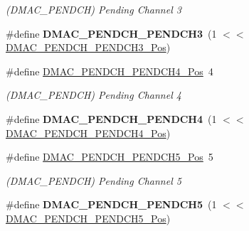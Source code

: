 \begin{DoxyCompactItemize}
\begin{DoxyCompactList}\small\item\em (D\+M\+A\+C\+\_\+\+P\+E\+N\+D\+C\+H) Pending Channel 3 \end{DoxyCompactList}\item 
\hypertarget{group___s_a_m_l21___d_m_a_c_ga0929ca10708f464fc4e4cdbf89cd5568}{}\#define {\bfseries D\+M\+A\+C\+\_\+\+P\+E\+N\+D\+C\+H\+\_\+\+P\+E\+N\+D\+C\+H3}~(1 $<$$<$ \hyperlink{group___s_a_m_l21___d_m_a_c_gaab6a540d960e9ebf33586e193f6eb3fe}{D\+M\+A\+C\+\_\+\+P\+E\+N\+D\+C\+H\+\_\+\+P\+E\+N\+D\+C\+H3\+\_\+\+Pos})\label{group___s_a_m_l21___d_m_a_c_ga0929ca10708f464fc4e4cdbf89cd5568}

\item 
\hypertarget{group___s_a_m_l21___d_m_a_c_gaa94dffd07747dd354da6950c442ddb7c}{}\#define \hyperlink{group___s_a_m_l21___d_m_a_c_gaa94dffd07747dd354da6950c442ddb7c}{D\+M\+A\+C\+\_\+\+P\+E\+N\+D\+C\+H\+\_\+\+P\+E\+N\+D\+C\+H4\+\_\+\+Pos}~4\label{group___s_a_m_l21___d_m_a_c_gaa94dffd07747dd354da6950c442ddb7c}

\begin{DoxyCompactList}\small\item\em (D\+M\+A\+C\+\_\+\+P\+E\+N\+D\+C\+H) Pending Channel 4 \end{DoxyCompactList}\item 
\hypertarget{group___s_a_m_l21___d_m_a_c_ga77bb07be9b512ad4babe3e942bfe7807}{}\#define {\bfseries D\+M\+A\+C\+\_\+\+P\+E\+N\+D\+C\+H\+\_\+\+P\+E\+N\+D\+C\+H4}~(1 $<$$<$ \hyperlink{group___s_a_m_l21___d_m_a_c_gaa94dffd07747dd354da6950c442ddb7c}{D\+M\+A\+C\+\_\+\+P\+E\+N\+D\+C\+H\+\_\+\+P\+E\+N\+D\+C\+H4\+\_\+\+Pos})\label{group___s_a_m_l21___d_m_a_c_ga77bb07be9b512ad4babe3e942bfe7807}

\item 
\hypertarget{group___s_a_m_l21___d_m_a_c_gae2c9f572251f601c26e61dbaf9f37c7a}{}\#define \hyperlink{group___s_a_m_l21___d_m_a_c_gae2c9f572251f601c26e61dbaf9f37c7a}{D\+M\+A\+C\+\_\+\+P\+E\+N\+D\+C\+H\+\_\+\+P\+E\+N\+D\+C\+H5\+\_\+\+Pos}~5\label{group___s_a_m_l21___d_m_a_c_gae2c9f572251f601c26e61dbaf9f37c7a}

\begin{DoxyCompactList}\small\item\em (D\+M\+A\+C\+\_\+\+P\+E\+N\+D\+C\+H) Pending Channel 5 \end{DoxyCompactList}\item 
\hypertarget{group___s_a_m_l21___d_m_a_c_gacd4ae2ca3c16f78b9c2072a471cc2984}{}\#define {\bfseries D\+M\+A\+C\+\_\+\+P\+E\+N\+D\+C\+H\+\_\+\+P\+E\+N\+D\+C\+H5}~(1 $<$$<$ \hyperlink{group___s_a_m_l21___d_m_a_c_gae2c9f572251f601c26e61dbaf9f37c7a}{D\+M\+A\+C\+\_\+\+P\+E\+N\+D\+C\+H\+\_\+\+P\+E\+N\+D\+C\+H5\+\_\+\+Pos})\label{group___s_a_m_l21___d_m_a_c_gacd4ae2ca3c16f78b9c2072a471cc2984}


\end{DoxyCompactItemize}
